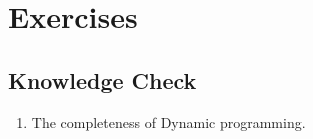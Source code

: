 \documentclass[../main.tex]{subfiles}
\begin{document}
\section{Exercises}
\subsection{Knowledge Check}
\begin{enumerate}
    \item The completeness of Dynamic programming. 
\end{enumerate}
\end{document}
